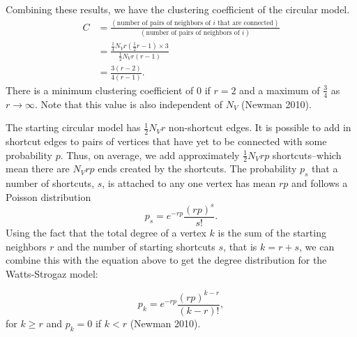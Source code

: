 \documentclass[12pt,twoside]{amherstthesis}
\begin{document}
  Combining these results, we have the clustering coefficient of the
  circular model. \[
  \begin{aligned}
  C &= \frac {(\text{number of pairs of neighbors of } i \text{ that are connected})} {(\text{number of pairs of neighbors of } i)} \\
  &= \frac {\frac {1} {4} N_{V} r \left(\frac {1} {2} r - 1 \right) \times 3} {\frac {1} {2} N_{V} r(r - 1)} \\
  &= \frac {3(r - 2)} {4(r - 1)}.
  \end{aligned}
  \] There is a minimum clustering coefficient of \(0\) if \(r = 2\) and a
  maximum of \(\frac {3} {4}\) as \(r \to \infty\). Note that this value
  is also independent of \(N_{V}\) (Newman 2010).
  
  The starting circular model has \(\frac {1} {2} N_{V}r\) non-shortcut
  edges. It is possible to add in shortcut edges to pairs of vertices that
  have yet to be connected with some probability \(p\). Thus, on average,
  we add approximately \(\frac {1} {2} N_{V}rp\) shortcuts--which mean
  there are \(N_{V}rp\) ends created by the shortcuts. The probability
  \(p_{s}\) that a number of shortcuts, \(s\), is attached to any one
  vertex has mean \(rp\) and follows a Poisson distribution
  \[p_{s} = e^{-rp} \frac {(rp)^{s}} {s!}.\] Using the fact that the total
  degree of a vertex \(k\) is the sum of the starting neighbors \(r\) and
  the number of starting shortcuts \(s\), that is \(k = r + s\), we can
  combine this with the equation above to get the degree distribution for
  the Watts-Strogaz model:
  
  \[p_{k} = e^{-rp} \frac {(rp)^{k - r}} {(k - r)!},\] for \(k \geq r\)
  and \(p_{k} = 0\) if \(k < r\) (Newman 2010).
  
\end{document}

